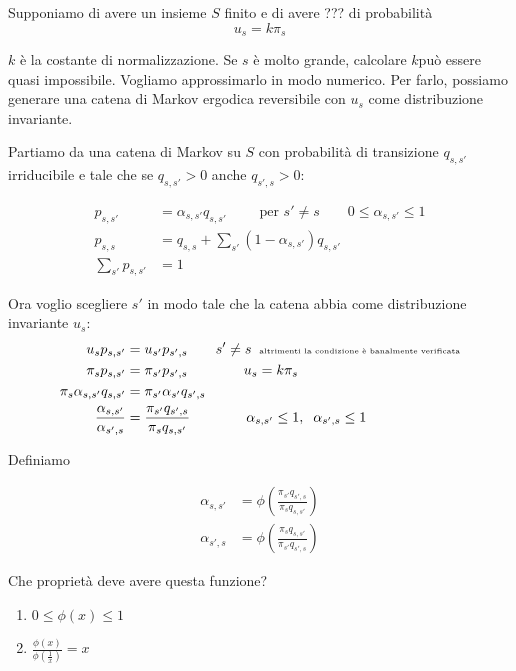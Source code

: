 \documentclass[a4paper,12pt]{book}
\newcommand\ddfrac[2]{\frac{\displaystyle #1}{\displaystyle #2}}
\begin{document}
Supponiamo di avere un insieme $ S $ finito e di avere ??? %
di probabilità 
$$ u_s = k\pi_s $$

$ k $ è la costante di normalizzazione. Se $ s $ è molto grande, calcolare $ k $può essere quasi impossibile. Vogliamo approssimarlo in modo numerico. Per farlo, possiamo generare una catena di Markov ergodica reversibile con $ u_s $ come distribuzione invariante. 

Partiamo da una catena di Markov su $ S $ con probabilità di transizione $ q_{s,s'} $ irriducibile e tale che se $ q_{s,s'} > 0 $ anche $ q_{s',s} > 0 $:

\begin{align*}
	 p_{s,s'} & = \alpha_{s,s'}q_{s,s'} \qquad \text{ per } s' \ne s \qquad 0 \le \alpha_{s,s'} \le 1 \\
	 p_{s,s} & = q_{s,s} + \sum_{s'}(1 - \alpha_{s,s'})q_{s,s'} \\
	 \sum_{s'}p_{s,s'} & = 1
\end{align*}

Ora voglio scegliere $ s' $ in modo tale che la catena abbia come distribuzione invariante $ u_s $:
\begin{align*}
	u_s p_{s,s'} & = u_{s'}p_{s',s} \qquad s' \ne s \; \; \text{\tiny altrimenti la condizione è banalmente verificata} \\
	\pi_s p_{s,s'} & = \pi_{s'}p_{s',s} \qquad \qquad u_s = k\pi_s \\
	\pi_s \alpha_{s,s'}q_{s,s'} & = \pi_{s'}\alpha_{s'}q_{s',s} \\		
	\ddfrac{\alpha_{s,s'}}{\alpha_{s',s}} & = \ddfrac{\pi_{s'}q_{s',s}}{\pi_s q_{s,s'}} \qquad \qquad \alpha_{s,s'} \le 1 , \; \;  \alpha_{s',s} \le 1
\end{align*}

Definiamo

\begin{align*}
	\alpha_{s,s'} & = \phi \left(\ddfrac{\pi_{s'} q_{s',s}}{\pi_s q_{s,s'}}\right) \\
	\alpha_{s',s} & = \phi \left(\ddfrac{\pi_{s} q_{s,s'}}{\pi_{s'} q_{s',s}}\right) 
\end{align*}

Che proprietà deve avere questa funzione?

\begin{enumerate}
	\item $ 0 \le \phi(x) \le 1 $
	\item $ \ddfrac{\phi(x)}{\phi\left(\frac{1}{x}\right)} = x $
\end{enumerate}
\end{document}
